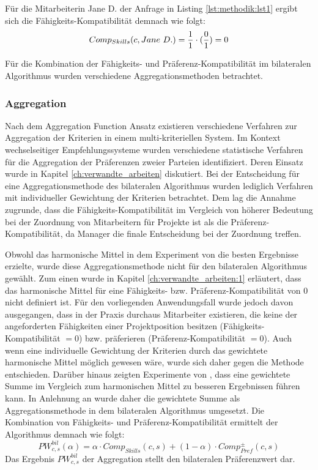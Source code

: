Für die Mitarbeiterin Jane D. der Anfrage in Listing \ref{lst:methodik:lst1} ergibt sich die Fähigkeits-Kompatibilität demnach wie folgt:
\begin{equation}\label{methodik:eq:5}
    Comp_{Skills}(c,Jane \textnormal{ }D.) = \frac{1}{1} \cdot (\frac{0}{1}) = 0
\end{equation}

Für die Kombination der Fähigkeits- und Präferenz-Kompatibilität im bilateralen Algorithmus wurden verschiedene Aggregationsmethoden betrachtet.

\subsubsection{Aggregation}
Nach dem Aggregation Function Ansatz existieren verschiedene Verfahren zur Aggregation der Kriterien in einem multi-kriteriellen System.
Im Kontext wechselseitiger Empfehlungssysteme wurden verschiedene statistische Verfahren für die Aggregation der Präferenzen zweier Parteien identifiziert.
Deren Einsatz wurde in Kapitel \ref{ch:verwandte_arbeiten} diskutiert.
Bei der Entscheidung für eine Aggregationsmethode des bilateralen Algorithmus wurden lediglich Verfahren mit individueller Gewichtung der Kriterien betrachtet.
Dem lag die Annahme zugrunde, dass die Fähigkeits-Kompatibilität im Vergleich von höherer Bedeutung bei der Zuordnung von Mitarbeitern für Projekte ist als die Präferenz-Kompatibilität, da Manager die finale Entscheidung bei der Zuordnung treffen.

Obwohl das harmonische Mittel in dem Experiment von \textcite[S. 1ff.]{kumari:2:inproceedings} die besten Ergebnisse erzielte, wurde diese Aggregationsmethode nicht für den bilateralen Algorithmus gewählt.
Zum einen wurde in Kapitel \ref{ch:verwandte_arbeiten:1} erläutert, dass das harmonische Mittel für eine Fähigkeits- bzw. Präferenz-Kompatibilität von 0 nicht definiert ist.
Für den vorliegenden Anwendungsfall wurde jedoch davon ausgegangen, dass in der Praxis durchaus Mitarbeiter existieren, die keine der angeforderten Fähigkeiten einer Projektposition besitzen (Fähigkeits-Kompatibilität $= 0$) bzw. präferieren (Präferenz-Kompatibilität $= 0$).
Auch wenn eine individuelle Gewichtung der Kriterien durch das gewichtete harmonische Mittel möglich gewesen wäre, wurde sich daher gegen die Methode entschieden.
Darüber hinaus zeigten Experimente von \textcite[S. 131ff.]{kleinerman:2:inproceedings}, dass eine gewichtete Summe im Vergleich zum harmonischen Mittel zu besseren Ergebnissen führen kann.
In Anlehnung an \textcite[S. 131ff.]{kleinerman:2:inproceedings} wurde daher die gewichtete Summe als Aggregationsmethode in dem bilateralen Algorithmus umgesetzt.
Die Kombination von Fähigkeits- und Präferenz-Kompatibilität ermittelt der Algorithmus demnach wie folgt:
\begin{equation}\label{methodik:eq:6}
    PW_{c,s}^{bil}(\alpha) = \alpha \cdot Comp_{Skills}(c,s) + (1-\alpha) \cdot Comp_{Pref}^{\pm}(c,s)
\end{equation}
Das Ergebnis $PW_{c,s}^{bil}$ der Aggregation stellt den bilateralen Präferenzwert dar.

